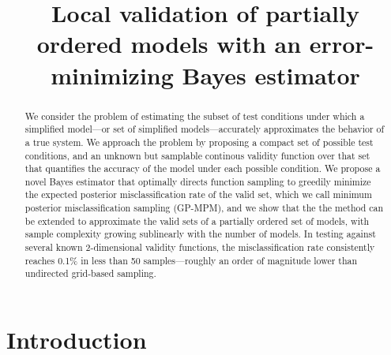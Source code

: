 \documentclass[letterpaper, 10 pt, conference]{ieeeconf}
\begin{document}
\title{Local validation of partially ordered models with an error-minimizing Bayes estimator}

\author{
\and
{}
}

\maketitle

\thispagestyle{plain}
\pagestyle{plain}

\begin{abstract}
We consider the problem of estimating the subset of test conditions under which a simplified model---or set of simplified models---accurately approximates the behavior of a true system. We approach the problem by proposing a compact set of possible test conditions, and an unknown but samplable continous validity function over that set that quantifies the accuracy of the model under each possible condition. We propose a novel Bayes estimator that optimally directs function sampling to greedily minimize the expected posterior misclassification rate of the valid set, which we call minimum posterior misclassification sampling (GP-MPM), and we show that the the method can be extended to approximate the valid sets of a partially ordered set of models, with sample complexity growing sublinearly with the number of models. In testing against several known 2-dimensional validity functions, the misclassification rate consistently reaches 0.1\% in less than 50 samples---roughly an order of magnitude lower than undirected grid-based sampling.
\end{abstract}


\section{Introduction}
\end{document}
